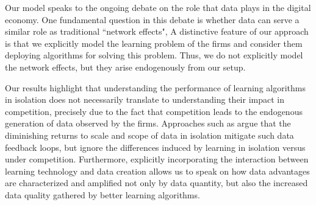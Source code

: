 Our model speaks to the ongoing debate on the role that data plays in the digital economy. One fundamental question in this debate is whether data can serve a similar role as traditional ``network effects", 
A distinctive feature of our approach is that we explicitly model the learning problem of the firms and consider them deploying algorithms for solving this problem.  Thus, we do not explicitly model the network effects, but they arise endogenously from our setup.

Our results highlight that understanding the performance of learning algorithms in isolation does not necessarily translate to understanding their impact in competition, precisely due to the fact that competition leads to the endogenous generation of data observed by the firms. Approaches such as \citet{lambrecht2015can, bajari2018impact} argue that the diminishing returns to scale and scope of data in isolation mitigate such data feedback loops,
but ignore the differences induced by learning in isolation versus under competition. Furthermore, explicitly incorporating the interaction between learning technology and data creation allows us to speak on how data advantages are characterized and amplified not only by data quantity, but also the increased data quality gathered by better learning algorithms.



